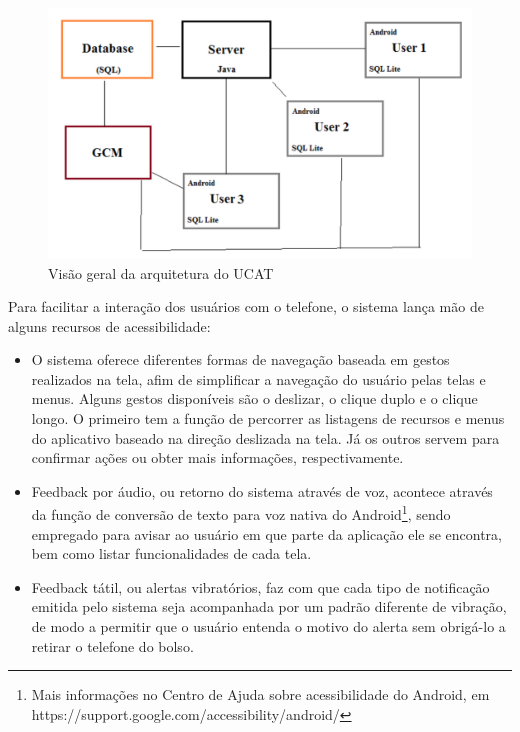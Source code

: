 \documentclass[english,brazilian]{UNISINOSmonografia}
\begin{document}
\FloatBarrier
\begin{figure}
	\caption{Visão geral da arquitetura do UCAT}
	\label{fig:visaoGeralUCAT}
	\centering%
	\begin{minipage}{.6\textwidth}
		\includegraphics[width=\textwidth]{imgs/ucatArquitetura}
		\end{minipage}
\end{figure}
\FloatBarrier

Para facilitar a interação dos usuários com o telefone, o sistema lança mão de alguns recursos de acessibilidade:
\begin{itemize}
	\item O sistema oferece diferentes formas de navegação baseada em gestos realizados na tela, afim de simplificar a navegação do usuário pelas telas e menus. Alguns gestos disponíveis são o deslizar, o clique duplo e o clique longo. O primeiro tem a função de percorrer as listagens de recursos e menus do aplicativo baseado na direção deslizada na tela. Já os outros servem para confirmar ações ou obter mais informações, respectivamente.
	
	\item Feedback por áudio, ou retorno do sistema através de voz, acontece através da função de conversão de texto para voz nativa do Android\footnote{Mais informações no Centro de Ajuda sobre acessibilidade do Android, em https://support.google.com/accessibility/android/}, sendo empregado para avisar ao usuário em que parte da aplicação ele se encontra, bem como listar funcionalidades de cada tela.

	\item Feedback tátil, ou alertas vibratórios, faz com que cada tipo de notificação emitida pelo sistema seja acompanhada por um padrão diferente de vibração, de modo a permitir que o usuário entenda o motivo do alerta sem obrigá-lo a retirar o telefone do bolso.
\end{itemize}
\end{document}
